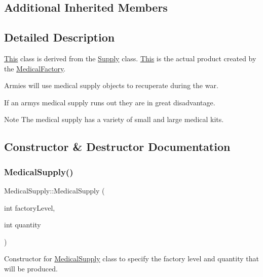 \subsection*{Additional Inherited Members}


\subsection{Detailed Description}
\mbox{\hyperlink{class_this}{This}} class is derived from the \mbox{\hyperlink{class_supply}{Supply}} class. \mbox{\hyperlink{class_this}{This}} is the actual product created by the \mbox{\hyperlink{class_medical_factory}{Medical\+Factory}}.
\begin{DoxyItemize}
\item Armies will use medical supply objects to recuperate during the war.
\item If an army\textquotesingle{}s medical supply runs out they are in great disadvantage. \begin{DoxyNote}{Note}
The medical supply has a variety of small and large medical kits. 
\end{DoxyNote}

\end{DoxyItemize}

\subsection{Constructor \& Destructor Documentation}
\mbox{\label{class_medical_supply_aa7b8f6fe340a4579a5a6d09b17e426ef}} 
\subsubsection{\texorpdfstring{MedicalSupply()}{MedicalSupply()}}
{\footnotesize\ttfamily Medical\+Supply\+::\+Medical\+Supply (\begin{DoxyParamCaption}\item[{int}]{factory\+Level,  }\item[{int}]{quantity }\end{DoxyParamCaption})}



Constructor for \mbox{\hyperlink{class_medical_supply}{Medical\+Supply}} class to specify the factory level and quantity that will be produced. 

